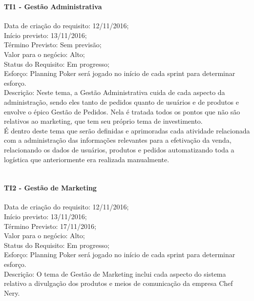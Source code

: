 \begin{apendicesenv}
\textbf{TI1 - Gestão Administrativa} \\
\tab \\
\tab Data de criação do requisito: 12/11/2016;\\
\tab Início previsto: 13/11/2016;\\
\tab Término Previsto: Sem previsão;\\
\tab Valor para o negócio: Alto;\\
\tab Status do Requisito: Em progresso;\\
\tab Esforço: Planning Poker será jogado no início de cada sprint para determinar esforço.\\
\tab Descrição: Neste tema, a Gestão Administrativa cuida de cada aspecto da administração, sendo eles tanto de pedidos quanto de usuários e de produtos e envolve o épico Gestão de Pedidos. Nela é tratada todos os pontos que não são relativos ao marketing, que tem seu próprio tema de investimento.\\
\tab É dentro deste tema que serão definidas e aprimoradas cada atividade relacionada com a administração das informações relevantes para a efetivação da venda, relacionando os dados de usuários, produtos e pedidos automatizando toda a logística que anteriormente era realizada manualmente.\\
\\
\tab \\
\textbf{TI2 - Gestão de Marketing} \\
\tab \\
\tab Data de criação do requisito: 12/11/2016;\\
\tab Início previsto: 13/11/2016;\\
\tab Término Previsto: 17/11/2016;\\
\tab Valor para o negócio: Alto;\\
\tab Status do Requisito: Em progresso;\\
\tab Esforço: Planning Poker será jogado no início de cada sprint para determinar esforço.\\
\tab Descrição:  O tema de Gestão de Marketing inclui cada aspecto do sistema relativo a divulgação dos produtos e meios de comunicação da empresa Chef Nery.\\
\\


\end{apendicesenv}
